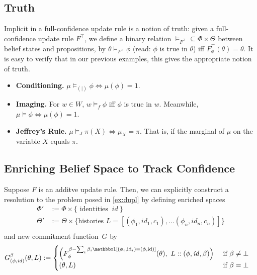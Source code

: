 \begin{subappendices}
    \subsection{Truth}
    Implicit in a full-confidence update rule is a notion of truth:
    given a full-confidence update rule $F^\top$, we define
    a binary relation ${\models_{F^\top}} \subseteq \Phi \times \Theta$ 
    between belief states and propositions, by 
    $\theta \models_{F^\top} \phi$
    (read: $\phi$ is true in $\theta$)
    iff $F^\top_\phi(\theta) = \theta$.
    It is easy to verify that in our previous examples,
    this gives the appropriate notion of truth.

    \begin{itemize}
    	\item \textbf{Conditioning.}
    	$\mu \models_{(|)} \phi \iff \mu(\phi) = 1$.
    	\item \textbf{Imaging.}
    	For $w \in W$, $w \models_f \phi$ iff $\phi$ is true in $w$. 
    	Meanwhile, $\mu \models \phi \iff \mu(\phi) = 1$.
    	\item \textbf{Jeffrey's Rule.}
    	$\mu \models_J \pi(X) \iff \mu_X = \pi$.
    	That is, if the marginal of $\mu$ on the variable $X$ equals $\pi$. 
    \end{itemize}


    \subsection{Enriching Belief Space to Track Confidence}

    \begin{example}\label{ex:dupl-enriched}
    Suppose $F$ is an additve update rule. Then, we can explicitly construct a resolution to the problem posed in \cref{ex:dupl} by defining enriched spaces
    \begin{align*}
    	\Phi' &:= \Phi \times \Big\{ \text{ identities }~ \mathit{id}~ \Big\}\\
    	\Theta' &:= \Theta \times
    		\Big\{ \text{histories } L = [(\phi_1, \mathit{id}_1, c_1), \ldots (\phi_n, \mathit{id}_n, c_n)] \Big\} \\
    \end{align*}
    and new commitment function\ $G$ by
    \begin{align*}
    	 G^{\beta}_{(\phi,\mathit{id})}(\theta, L) & :=
    		\begin{cases}
    		\Big( F^{\beta- \sum_{i}\beta_i \mathbbm1[(\phi_i,\mathrm{id}_i) = (\phi, \mathrm{id})]}_{\phi}(\theta),~
    			 L :: (\phi,\mathit{id}, \beta)
    		 \Big)
    			 &\text{ if } \beta \ne \bot \\
    		(\theta, L) &
    			   \text{ if } \beta = \bot
    	\end{cases}
    \end{align*}
    \end{example}



\end{subappendices}
